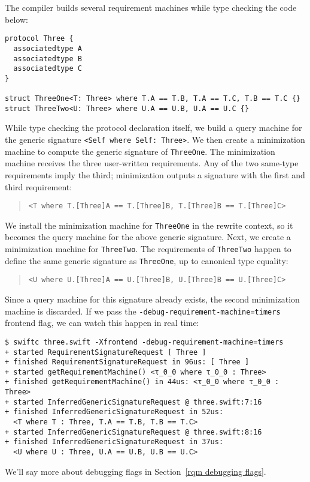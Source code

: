 \documentclass[../generics]{subfiles}
\begin{document}
\begin{example}
The compiler builds several requirement machines while type checking the code below:
\begin{Verbatim}
protocol Three {
  associatedtype A
  associatedtype B
  associatedtype C
}

struct ThreeOne<T: Three> where T.A == T.B, T.A == T.C, T.B == T.C {}
struct ThreeTwo<U: Three> where U.A == U.B, U.A == U.C {}
\end{Verbatim}

While type checking the protocol declaration itself, we build a query machine for the generic signature \verb|<Self where Self: Three>|. We then create a minimization machine to compute the generic signature of \texttt{ThreeOne}. The minimization machine receives the three user-written requirements. Any of the two same-type requirements imply the third; minimization outputs a signature with the first and third requirement:
\begin{quote}
\begin{verbatim}
<T where T.[Three]A == T.[Three]B, T.[Three]B == T.[Three]C>
\end{verbatim}
\end{quote}
We install the minimization machine for \texttt{ThreeOne} in the rewrite context, so it becomes the query machine for the above generic signature. Next, we create a minimization machine for \texttt{ThreeTwo}. The requirements of \texttt{ThreeTwo} happen to define the same generic signature as \texttt{ThreeOne}, up to canonical type equality:
\begin{quote}
\begin{verbatim}
<U where U.[Three]A == U.[Three]B, U.[Three]B == U.[Three]C>
\end{verbatim}
\end{quote}
Since a query machine for this signature already exists, the second minimization machine is discarded. If we pass the \texttt{-debug-requirement-machine=timers} frontend flag, we can watch this happen in real time:
\begin{Verbatim}[fontsize=\footnotesize,numbers=none]
$ swiftc three.swift -Xfrontend -debug-requirement-machine=timers
+ started RequirementSignatureRequest [ Three ]
+ finished RequirementSignatureRequest in 96us: [ Three ]
+ started getRequirementMachine() <τ_0_0 where τ_0_0 : Three>
+ finished getRequirementMachine() in 44us: <τ_0_0 where τ_0_0 : Three>
+ started InferredGenericSignatureRequest @ three.swift:7:16
+ finished InferredGenericSignatureRequest in 52us:
  <T where T : Three, T.A == T.B, T.B == T.C>
+ started InferredGenericSignatureRequest @ three.swift:8:16
+ finished InferredGenericSignatureRequest in 37us:
  <U where U : Three, U.A == U.B, U.B == U.C>
\end{Verbatim}
\end{example}
We'll say more about debugging flags in Section~\ref{rqm debugging flags}.
\end{document}
